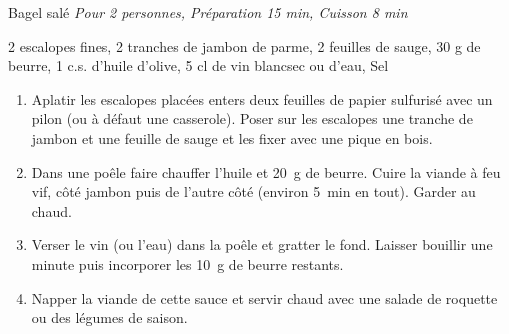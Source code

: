 \begin{recette}{Bagel salé}
  \emph{Pour 2 personnes, Préparation 15 min, Cuisson 8 min}
	\begin{ingredients}
    2 escalopes fines\sep
    2 tranches de jambon de parme\sep
    2 feuilles de sauge\sep
    30 g de beurre\sep
    1 c.s. d’huile d’olive\sep
    5 cl de vin blancsec ou d’eau\sep
    Sel
	\end{ingredients}
	
	\begin{enumerate}
	\item Aplatir les escalopes placées enters deux feuilles de papier sulfurisé avec un pilon (ou à défaut une casserole). Poser sur les escalopes une tranche de jambon et une feuille de sauge et les fixer avec une pique en bois.
  \item Dans une poêle faire chauffer l’huile et 20~g de beurre. Cuire la viande à feu vif, côté jambon puis de l’autre côté (environ 5~min en tout). Garder au chaud.
  \item Verser le vin (ou l’eau) dans la poêle et gratter le fond. Laisser bouillir une minute puis incorporer les 10~g de beurre restants.
    \item Napper la viande de cette sauce et servir chaud avec une salade de roquette ou des légumes de saison.
	\end{enumerate}
\end{recette}
